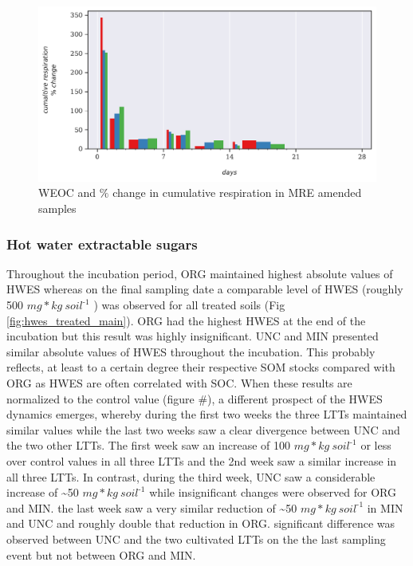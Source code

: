 \documentclass[12pt]{report}
\newlength{\SpaceAfterUnit}
\newcommand{\genericunit}{$ mg * kg\ soil^{\text{-}1}$ \hspace*{\SpaceAfterUnit}}
\begin{document}
%			
%		
		\begin{figure}[H]
			\centering
			\includegraphics[scale=0.8]{thesis_figures/main_incubation/MRE_treated/weoc_pct_change.pdf}
			\caption{WEOC and $ \% $ change in cumulative respiration in MRE amended samples}
			\label{fig:weoc_pct_change_treated_main}
		\end{figure}
	
	\subsubsection{Hot water extractable sugars}
		Throughout the incubation period, ORG maintained highest absolute values of HWES whereas on the final sampling date a comparable level of HWES (roughly 500 \genericunit) was observed for all treated soils (Fig \ref{fig:hwes_treated_main}). ORG  had the highest HWES at the end of the incubation but this result was highly insignificant. UNC and MIN presented similar absolute values of HWES throughout the incubation. This probably reflects, at least to a certain degree their respective SOM stocks compared with ORG as HWES are often correlated with SOC.
		When these results are normalized to the control value (figure \#), a different prospect of the HWES dynamics emerges, whereby during the first two weeks the three LTTs maintained similar values while the last two weeks saw a clear divergence between UNC and the two other LTTs. The first week saw an increase of 100 \genericunit or less over control values in all three LTTs and the 2nd week saw a similar increase in all three LTTs. In contrast, during the third week, UNC saw a considerable increase of \~{}50 \genericunit while insignificant changes were observed for ORG and MIN. the last week saw a very similar reduction of \~{}50 \genericunit in MIN and UNC and roughly double that reduction in ORG. significant difference was observed between UNC and the two cultivated LTTs on the the last sampling event but not between ORG and MIN.
		
\end{document}
